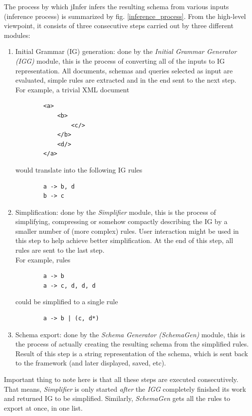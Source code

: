 \documentclass[a4paper,10pt,oneside]{article}
\begin{document}

The process by which jInfer infers the resulting schema from various inputs (inference process) is summarized by fig. \ref{inference_process}. From the high-level viewpoint, it consists of three consecutive steps carried out by three different modules:
\begin{enumerate}
	\item Initial Grammar (IG) generation: done by the \textit{Initial Grammar Generator (IGG)} module, this is the process of converting all of the inputs to IG representation. All documents, schemas and queries selected as input are evaluated, simple rules are extracted and in the end sent to the next step.\\
	For example, a trivial XML document
	\begin{verbatim}
		<a>
			<b>
				<c/>
			</b>
			<d/>
		</a>
	\end{verbatim}
	would translate into the following IG rules
	\begin{verbatim}
		a -> b, d
		b -> c
	\end{verbatim}	
	\item Simplification: done by the \textit{Simplifier} module, this is the process of simplifying, compressing or somehow compactly describing the IG by a smaller number of (more complex) rules. User interaction might be used in this step to help achieve better simplification. At the end of this step, all rules are sent to the last step.\\
	For example, rules
	\begin{verbatim}
		a -> b
		a -> c, d, d, d
	\end{verbatim}
	could be simplified to a single rule
	\begin{verbatim}
		a -> b | (c, d*)
	\end{verbatim}
	\item Schema export: done by the \textit{Schema Generator (SchemaGen)} module, this is the process of actually creating the resulting schema from the simplified rules. Result of this step is a string representation of the schema, which is sent back to the framework (and later displayed, saved, etc).\\
\end{enumerate}
Important thing to note here is that all these steps are executed consecutively. That means, \textit{Simplifier} is only started \textit{after} the \textit{IGG} completely finished its work and returned IG to be simplified. Similarly, \textit{SchemaGen} gets all the rules to export at once, in one list.\\
\end{document}
